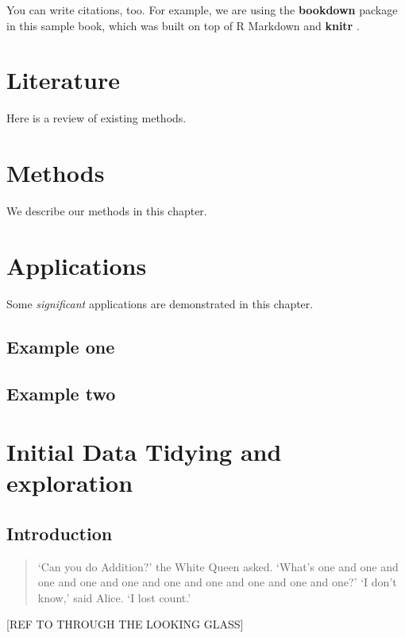 \documentclass[]{book}
\theoremstyle{definition}
\theoremstyle{definition}
\theoremstyle{definition}
\theoremstyle{remark}
\begin{document}
You can write citations, too. For example, we are using the
\textbf{bookdown} package \citep{R-bookdown} in this sample book, which
was built on top of R Markdown and \textbf{knitr} \citep{xie2015}.

\chapter{Literature}\label{literature}

Here is a review of existing methods.

\chapter{Methods}\label{methods}

We describe our methods in this chapter.

\chapter{Applications}\label{applications}

Some \emph{significant} applications are demonstrated in this chapter.

\section{Example one}\label{example-one}

\section{Example two}\label{example-two}

\chapter{Initial Data Tidying and exploration}\label{tidy_data}

\section{Introduction}\label{introduction}

\begin{quote}
`Can you do Addition?' the White Queen asked. `What's one and one and
one and one and one and one and one and one and one and one?' `I don't
know,' said Alice. `I lost count.'
\end{quote}

{[}REF TO THROUGH THE LOOKING GLASS{]}
\end{document}
